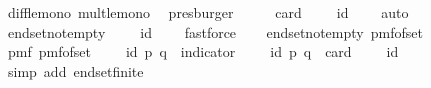 \begin{isabellebody}
\ diff{\isacharunderscore}{\kern0pt}le{\isacharunderscore}{\kern0pt}mono\ mult{\isacharunderscore}{\kern0pt}le{\isacharunderscore}{\kern0pt}mono\ \isamarkupfalse%
\ presburger\isanewline
\ \ \isamarkupfalse%
\ \isamarkupfalse%
\ {\isachardoublequoteopen}card\ {\isacharparenleft}{\kern0pt}{\isacharparenleft}{\kern0pt}{\isasymK}\ {\isasymtimes}\ {\isasymK}{\isacharparenright}{\kern0pt}\ {\isacharminus}{\kern0pt}\ {\isacharquery}{\kern0pt}id{\isacharparenright}{\kern0pt}\ {\isasymge}\ {}{\isachardoublequoteclose}\ \isamarkupfalse%
\ auto\isanewline
\ \ \isamarkupfalse%
\ \isamarkupfalse%
\ end{\isacharunderscore}{\kern0pt}set{\isacharunderscore}{\kern0pt}not{\isacharunderscore}{\kern0pt}empty{\isacharcolon}{\kern0pt}\ {\isachardoublequoteopen}{\isacharparenleft}{\kern0pt}{\isasymK}\ {\isasymtimes}\ {\isasymK}{\isacharparenright}{\kern0pt}\ {\isacharminus}{\kern0pt}\ {\isacharquery}{\kern0pt}id\ {\isasymnoteq}\ {\isacharbraceleft}{\kern0pt}{\isacharbraceright}{\kern0pt}{\isachardoublequoteclose}\ \isamarkupfalse%
\ fastforce\isanewline
\isanewline
\ \ \isamarkupfalse%
\ end{\isacharunderscore}{\kern0pt}set{\isacharunderscore}{\kern0pt}not{\isacharunderscore}{\kern0pt}empty\ pmf{\isacharunderscore}{\kern0pt}of{\isacharunderscore}{\kern0pt}set\isanewline
\ \ \isamarkupfalse%
\ {\isachardoublequoteopen}pmf\ {\isacharparenleft}{\kern0pt}pmf{\isacharunderscore}{\kern0pt}of{\isacharunderscore}{\kern0pt}set\ {\isacharparenleft}{\kern0pt}{\isasymK}\ {\isasymtimes}\ {\isasymK}\ {\isacharminus}{\kern0pt}\ {\isacharquery}{\kern0pt}id{\isacharparenright}{\kern0pt}{\isacharparenright}{\kern0pt}\ {\isacharparenleft}{\kern0pt}p{\isacharcomma}{\kern0pt}\ q{\isacharparenright}{\kern0pt}\ {\isacharequal}{\kern0pt}\ indicator\ {\isacharparenleft}{\kern0pt}{\isasymK}\ {\isasymtimes}\ {\isasymK}\ {\isacharminus}{\kern0pt}\ {\isacharquery}{\kern0pt}id{\isacharparenright}{\kern0pt}\ {\isacharparenleft}{\kern0pt}p{\isacharcomma}{\kern0pt}\ q{\isacharparenright}{\kern0pt}\ {\isacharslash}{\kern0pt}\ {\isacharparenleft}{\kern0pt}card\ {\isacharparenleft}{\kern0pt}{\isasymK}\ {\isasymtimes}\ {\isasymK}\ {\isacharminus}{\kern0pt}\ {\isacharquery}{\kern0pt}id{\isacharparenright}{\kern0pt}{\isacharparenright}{\kern0pt}{\isachardoublequoteclose}\ \isanewline
\ \ \ \ \isamarkupfalse%
\ {\isacharparenleft}{\kern0pt}simp\ add{\isacharcolon}{\kern0pt}\ end{\isacharunderscore}{\kern0pt}set{\isacharunderscore}{\kern0pt}finite{\isacharparenright}{\kern0pt}\isanewline

\end{isabellebody}
